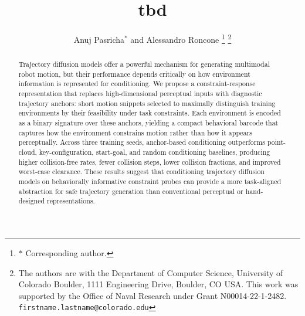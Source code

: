 \documentclass[letterpaper, 10 pt, conference]{ieeeconf}  %
\theoremstyle{definition}
\begin{document}

\title{\LARGE \bf
tbd
}

\author{Anuj Pasricha$^{*}$ and Alessandro Roncone%
\thanks{$*$ Corresponding author.}%
\thanks{The authors are with the Department of Computer Science, University of Colorado Boulder, 1111 Engineering Drive, Boulder, CO USA. This work was supported by the Office of Naval Research under Grant N00014-22-1-2482. {\tt\small firstname.lastname@colorado.edu}}%
}

\maketitle
\thispagestyle{empty}
\pagestyle{empty}

\begin{abstract}
Trajectory diffusion models offer a powerful mechanism for generating multimodal robot motion, but their performance depends critically on how environment information is represented for conditioning.
We propose a constraint-response representation that replaces high-dimensional perceptual inputs with diagnostic trajectory anchors: short motion snippets selected to maximally distinguish training environments by their feasibility under task constraints.
Each environment is encoded as a binary signature over these anchors, yielding a compact behavioral barcode that captures how the environment constrains motion rather than how it appears perceptually.
Across three training seeds, anchor-based conditioning outperforms point-cloud, key-configuration, start-goal, and random conditioning baselines, producing higher collision-free rates, fewer collision steps, lower collision fractions, and improved worst-case clearance.
These results suggest that conditioning trajectory diffusion models on behaviorally informative constraint probes can provide a more task-aligned abstraction for safe trajectory generation than conventional perceptual or hand-designed representations.
\end{abstract}







\AtNextBibliography{\footnotesize}
\printbibliography
\end{document}
